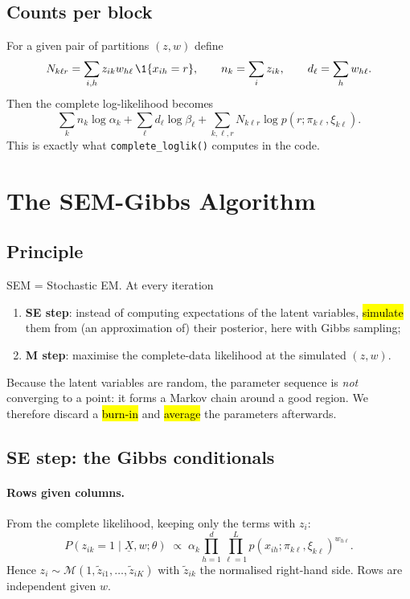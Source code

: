 \subsection{Counts per block}

For a given pair of partitions $(z,w)$ define
\[
N_{k\ell r}=\sum_{i,h}z_{ik}w_{h\ell}\,\1\{x_{ih}=r\},
\qquad
n_k=\sum_iz_{ik},
\qquad
d_\ell=\sum_hw_{h\ell}.
\]
Then the complete log-likelihood becomes
\[
\boxed{
\sum_kn_k\log\alpha_k+\sum_\ell d_\ell\log\beta_\ell
+\sum_{k,\ell,r}N_{k\ell r}\log p(r;\pi_{k\ell},\xi_{k\ell}).
}
\]
This is exactly what \texttt{complete\_loglik()} computes in the code.

\section{The SEM-Gibbs Algorithm}

\subsection{Principle}

SEM = Stochastic EM. At every iteration
\begin{enumerate}
  \item \textbf{SE step}: instead of computing expectations of the latent
  variables, \hl{simulate} them from (an approximation of) their posterior,
  here with Gibbs sampling;
  \item \textbf{M step}: maximise the complete-data likelihood at the
  simulated $(z,w)$.
\end{enumerate}
Because the latent variables are random, the parameter sequence is
\emph{not} converging to a point: it forms a Markov chain around a
good region. We therefore discard a \hl{burn-in} and \hl{average} the
parameters afterwards.

\subsection{SE step: the Gibbs conditionals}

\paragraph{Rows given columns.}
From the complete likelihood, keeping only the terms with $z_i$:
\[
P(z_{ik}=1\mid\underline{X},w;\theta)
\;\propto\;
\alpha_k\prod_{h=1}^d\prod_{\ell=1}^L
p(x_{ih};\pi_{k\ell},\xi_{k\ell})^{w_{h\ell}}.
\]
Hence $z_i\sim\mathcal{M}(1,\tilde z_{i1},\ldots,\tilde z_{iK})$ with
$\tilde z_{ik}$ the normalised right-hand side. Rows are independent given
$w$.

